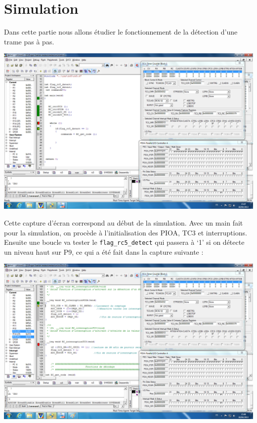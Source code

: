 \documentclass[a4paper]{report}
\begin{document}
\section{Simulation}
Dans cette partie nous allons étudier le fonctionnement de la détection d’une trame pas à pas.

\begin{center}
	\includegraphics[scale=0.3]{images/RC_simu1.png}
\end{center}

Cette capture d’écran correspond au début de la simulation.
Avec un main fait pour la simulation, on procède à l’initialisation des PIOA, TC3 et interruptions.
Ensuite une boucle va tester le \texttt{flag\_rc5\_detect} qui passera à ‘1’ si on détecte un niveau haut sur P9, ce qui a été fait dans la capture suivante :

\begin{center}
	\includegraphics[scale=0.3]{images/RC_simu2.png}
\end{center}
\end{document}
